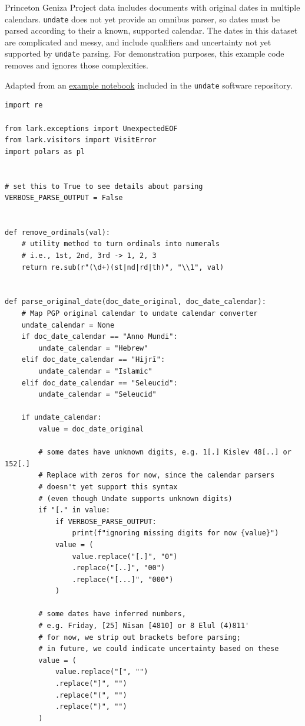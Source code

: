 \documentclass[final]{anthology-ch} %
\begin{document}
Princeton Geniza Project data includes documents with original dates in multiple calendars.  \texttt{undate} does not yet provide an omnibus parser, so dates must be parsed according to their a known, supported calendar.  The dates in this dataset are complicated and messy, and include qualifiers and uncertainty not yet supported by \texttt{undat}e parsing. For demonstration purposes, this example code removes and ignores those complexities.

Adapted from an \href{https://github.com/dh-tech/undate-python/blob/main/examples/pgp_dates.ipynb}{example notebook} included in the \texttt{undate} software repository.

\begin{verbatim}
import re

from lark.exceptions import UnexpectedEOF
from lark.visitors import VisitError
import polars as pl


# set this to True to see details about parsing
VERBOSE_PARSE_OUTPUT = False


def remove_ordinals(val):
    # utility method to turn ordinals into numerals
    # i.e., 1st, 2nd, 3rd -> 1, 2, 3
    return re.sub(r"(\d+)(st|nd|rd|th)", "\\1", val)


def parse_original_date(doc_date_original, doc_date_calendar):
    # Map PGP original calendar to undate calendar converter
    undate_calendar = None
    if doc_date_calendar == "Anno Mundi":
        undate_calendar = "Hebrew"
    elif doc_date_calendar == "Hijrī":
        undate_calendar = "Islamic"
    elif doc_date_calendar == "Seleucid":
        undate_calendar = "Seleucid"

    if undate_calendar:
        value = doc_date_original

        # some dates have unknown digits, e.g. 1[.] Kislev 48[..] or 152[.]
        # Replace with zeros for now, since the calendar parsers
        # doesn't yet support this syntax
        # (even though Undate supports unknown digits)
        if "[." in value:
            if VERBOSE_PARSE_OUTPUT:
                print(f"ignoring missing digits for now {value}")
            value = (
                value.replace("[.]", "0")
                .replace("[..]", "00")
                .replace("[...]", "000")
            )

        # some dates have inferred numbers, 
        # e.g. Friday, [25] Nisan [4810] or 8 Elul (4)811'
        # for now, we strip out brackets before parsing;
        # in future, we could indicate uncertainty based on these
        value = (
            value.replace("[", "")
            .replace("]", "")
            .replace("(", "")
            .replace(")", "")
        )


\end{verbatim}
\end{document}
